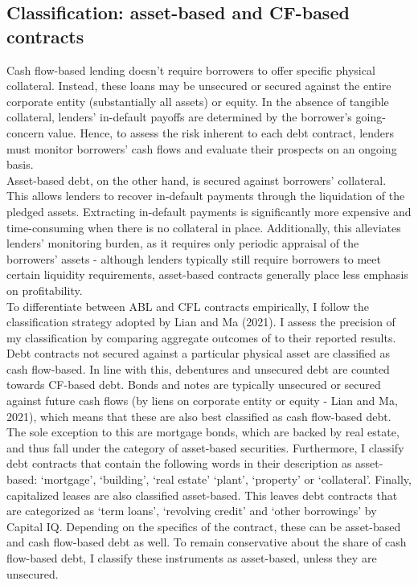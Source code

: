 \documentclass[12pt]{article}
\begin{document}
\subsection{Classification: asset-based and CF-based contracts \label{sec:classification}}
Cash flow-based lending doesn't require borrowers to offer specific physical collateral. Instead, these loans may be unsecured or secured against the entire corporate entity (substantially all assets) or equity. In the absence of tangible collateral, lenders' in-default payoffs are determined by the borrower's going-concern value. Hence, to assess the risk inherent to each debt contract, lenders must monitor borrowers’ cash flows and evaluate their prospects on an ongoing basis.  \vspace{3mm} \\
Asset-based debt, on the other hand, is secured against borrowers’ collateral. This allows lenders to recover in-default payments through the liquidation of the pledged assets. Extracting in-default payments is significantly more expensive and time-consuming when there is no collateral in place. Additionally, this alleviates lenders’ monitoring burden, as it requires only periodic appraisal of the borrowers' assets - although lenders typically still require borrowers to meet certain liquidity requirements, asset-based contracts generally place less emphasis on profitability. \vspace{3mm} \\
To differentiate between ABL and CFL contracts empirically, I follow the classification strategy adopted by Lian and Ma (2021). I assess the precision of my classification by comparing aggregate outcomes of to their reported results. \vspace{3mm} \\
Debt contracts not secured against a particular physical asset are classified as cash flow-based. In line with this, debentures and unsecured debt are counted towards CF-based debt. Bonds and notes are typically unsecured or secured against future cash flows (by liens on corporate entity or equity - Lian and Ma, 2021), which means that these are also best classified as cash flow-based debt. The sole exception to this are mortgage bonds, which are backed by real estate, and thus fall under the category of asset-based securities. Furthermore, I classify debt contracts that contain the following words in their description as asset-based: `mortgage', `building', `real estate' `plant', `property' or `collateral'. Finally, capitalized leases are also classified asset-based. This leaves debt contracts that are categorized as `term loans', `revolving credit' and `other borrowings' by Capital IQ. Depending on the specifics of the contract, these can be asset-based and cash flow-based debt as well. To remain conservative about the share of cash flow-based debt, I classify these instruments as asset-based, unless they are unsecured.  \vspace{3mm} \\
\end{document}
